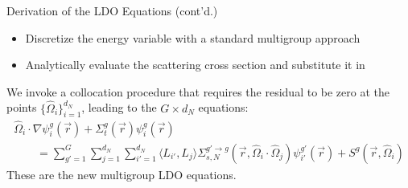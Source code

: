\documentclass[xcolor=x11names,compress,handout]{beamer}
\renewcommand{\(}{\begin{columns}}
\renewcommand{\)}{\end{columns}}
\newcommand{\<}[1]{\begin{column}{#1}}
\renewcommand{\>}{\end{column}}
\newcommand{\vOmega}{\ensuremath{\hat{\Omega}}}
\newcommand{\vecr}{\vec{r}}
\newcommand{\sigt}{\Sigma_t}
\newcommand{\sigs}{\Sigma_s}
\newcommand{\maths}{\mathbb{S}^2}
\newcommand{\dn}{d_N}
\begin{document}
\begin{frame}[label=group_disc]{Derivation of the LDO Equations (cont'd.)}
\begin{itemize}
\item Discretize the energy variable with a standard multigroup approach
\pause
\item Analytically evaluate the scattering cross section and substitute it in%
\end{itemize}
\pause
We invoke a collocation procedure that requires the residual to be zero at the points 
$\{\vOmega_i\}_{i=1}^{\dn}$, leading to the $G\times\dn$ equations:
\begin{multline}
\vOmega_i\cdot\nabla\psi_i^g(\vecr) + \Sigma_t^g(\vecr)\psi_i^g(\vecr) \\ \qquad= 
\sum_{g'=1}^{G}\sum_{j=1}^{\dn}\sum_{i'=1}^{\dn}\langle L_{i'},L_j\rangle\Sigma_{s,N}^{g'\rightarrow g}(\vecr,\vOmega_i\cdot\vOmega_j)\psi_{i'}^{g'}(\vecr) + S^g(\vecr,\vOmega_i)%
\end{multline}
These are the new multigroup LDO equations.
\end{frame}
\end{document}
